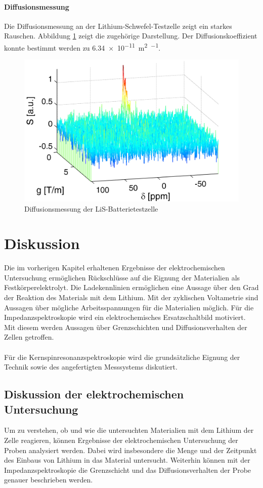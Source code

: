 \documentclass[a4paper, 11pt, headsepline,footsepline,twoside,abstract]{scrbook}
\begin{document}
\subsubsection{Diffusionsmessung}
Die Diffusionsmessung an der Lithium-Schwefel-Testzelle zeigt ein starkes Rauschen. Abbildung \ref{LiS_Diff} zeigt die zugehörige Darstellung. Der Diffusionskoeffizient konnte bestimmt werden zu \SI{6,34e-11}{\square\meter\per\sec}.
\begin{figure}
	\centering
	\includegraphics[width=0.95\columnwidth]{images/LiS_Diff_Batterie.jpg}
	\caption{Diffusionsmessung der LiS-Batterietestzelle}
	\label{LiS_Diff}
\end{figure} 

\chapter{Diskussion}
Die im vorherigen Kapitel erhaltenen Ergebnisse der elektrochemischen Untersuchung ermöglichen Rückschlüsse auf die Eignung der Materialien als Festkörperelektrolyt. Die Ladekennlinien ermöglichen eine Aussage über den Grad der Reaktion des Materials mit dem Lithium. Mit der zyklischen Voltametrie sind Aussagen über mögliche Arbeitsspannungen für die Materialien möglich. Für die Impedanzspektroskopie wird ein elektrochemisches Ersatzschaltbild motiviert. Mit diesem werden Aussagen über Grenzschichten und Diffusionsverhalten der Zellen getroffen.
\\\\
Für die Kernspinresonanzspektroskopie wird die grundsätzliche Eignung der Technik sowie des angefertigten Messsystems diskutiert. %
\section{Diskussion der elektrochemischen Untersuchung}
Um zu verstehen, ob und wie die untersuchten Materialien mit dem Lithium der Zelle reagieren, können Ergebnisse der elektrochemischen Untersuchung der Proben analysiert werden. Dabei wird insbesondere die Menge und der Zeitpunkt des Einbaus von Lithium in das Material untersucht. Weiterhin können mit der Impedanzspektroskopie die Grenzschicht und das Diffusionsverhalten der Probe genauer beschrieben werden.
\end{document}

